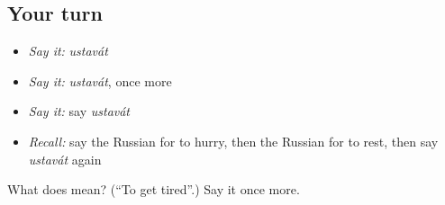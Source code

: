 \subsection*{Your turn}
\begin{itemize}
\raggedright
  \item \emph{Say it:} \emph{ustavát}
  \item \emph{Say it:} \emph{ustavát}, once more
  \item \emph{Say it:} say \emph{ustavát}
  \item \emph{Recall:} say the Russian for to hurry, then the Russian for to rest, then say \emph{ustavát} again
\end{itemize}

\begin{tcolorbox}[breakable,colback=teal!4,colframe=teal!35!black,title={Before you move on}]
What does  mean? (\textquotedblleft{}To get tired\textquotedblright{}.) Say it once more.
\end{tcolorbox}
